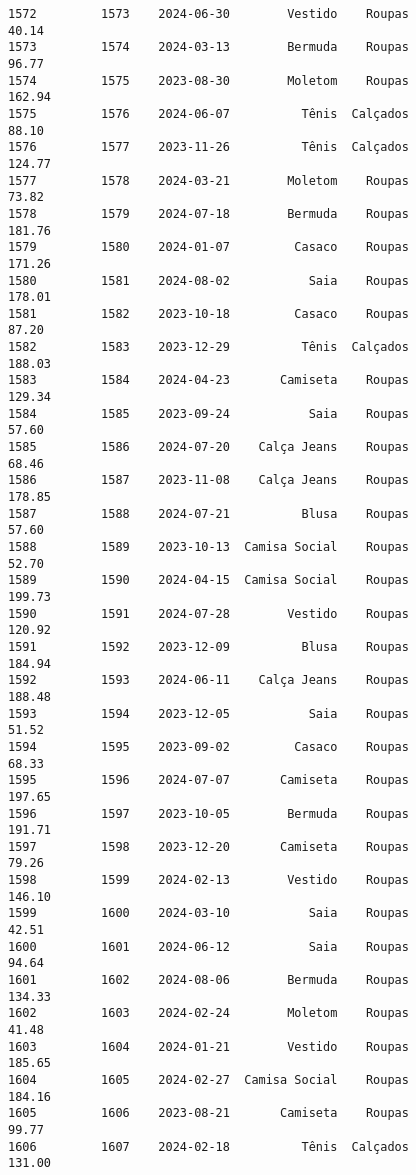 \documentclass[11pt]{article}
\begin{document}
\begin{Verbatim}[commandchars=\\\{\}]
1572         1573    2024-06-30        Vestido    Roupas           40.14   
1573         1574    2024-03-13        Bermuda    Roupas           96.77   
1574         1575    2023-08-30        Moletom    Roupas          162.94   
1575         1576    2024-06-07          Tênis  Calçados           88.10   
1576         1577    2023-11-26          Tênis  Calçados          124.77   
1577         1578    2024-03-21        Moletom    Roupas           73.82   
1578         1579    2024-07-18        Bermuda    Roupas          181.76   
1579         1580    2024-01-07         Casaco    Roupas          171.26   
1580         1581    2024-08-02           Saia    Roupas          178.01   
1581         1582    2023-10-18         Casaco    Roupas           87.20   
1582         1583    2023-12-29          Tênis  Calçados          188.03   
1583         1584    2024-04-23       Camiseta    Roupas          129.34   
1584         1585    2023-09-24           Saia    Roupas           57.60   
1585         1586    2024-07-20    Calça Jeans    Roupas           68.46   
1586         1587    2023-11-08    Calça Jeans    Roupas          178.85   
1587         1588    2024-07-21          Blusa    Roupas           57.60   
1588         1589    2023-10-13  Camisa Social    Roupas           52.70   
1589         1590    2024-04-15  Camisa Social    Roupas          199.73   
1590         1591    2024-07-28        Vestido    Roupas          120.92   
1591         1592    2023-12-09          Blusa    Roupas          184.94   
1592         1593    2024-06-11    Calça Jeans    Roupas          188.48   
1593         1594    2023-12-05           Saia    Roupas           51.52   
1594         1595    2023-09-02         Casaco    Roupas           68.33   
1595         1596    2024-07-07       Camiseta    Roupas          197.65   
1596         1597    2023-10-05        Bermuda    Roupas          191.71   
1597         1598    2023-12-20       Camiseta    Roupas           79.26   
1598         1599    2024-02-13        Vestido    Roupas          146.10   
1599         1600    2024-03-10           Saia    Roupas           42.51   
1600         1601    2024-06-12           Saia    Roupas           94.64   
1601         1602    2024-08-06        Bermuda    Roupas          134.33   
1602         1603    2024-02-24        Moletom    Roupas           41.48   
1603         1604    2024-01-21        Vestido    Roupas          185.65   
1604         1605    2024-02-27  Camisa Social    Roupas          184.16   
1605         1606    2023-08-21       Camiseta    Roupas           99.77   
1606         1607    2024-02-18          Tênis  Calçados          131.00   

\end{Verbatim}
\end{document}
